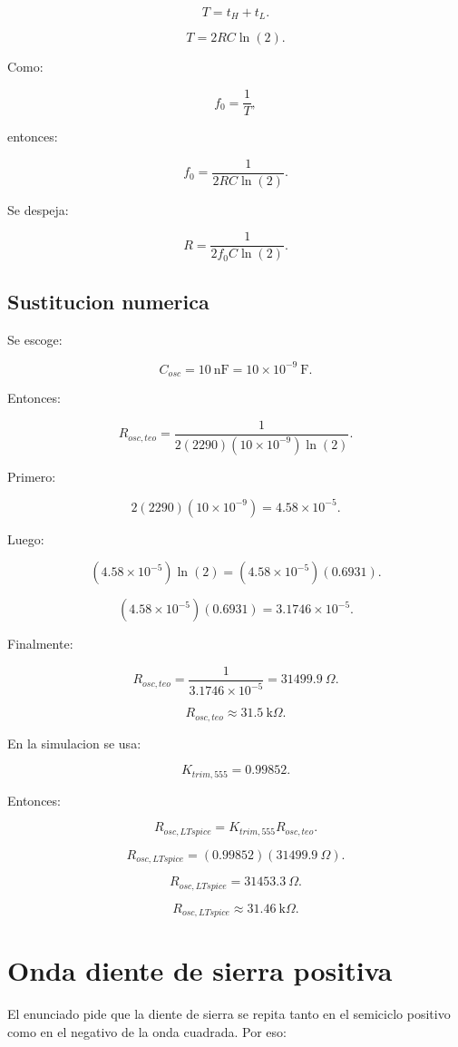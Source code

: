 \documentclass[11pt,letterpaper]{article}
\begin{document}
\[
T=t_H+t_L.
\]

\[
T=2RC\ln(2).
\]

Como:

\[
f_0=\frac{1}{T},
\]

entonces:

\[
f_0=\frac{1}{2RC\ln(2)}.
\]

Se despeja:

\[
R=\frac{1}{2f_0C\ln(2)}.
\]

\subsection{Sustitucion numerica}

Se escoge:

\[
C_{osc}=10~\text{nF}=10\times 10^{-9}~\text{F}.
\]

Entonces:

\[
R_{osc,teo}=
\frac{1}
{2(2290)(10\times 10^{-9})\ln(2)}.
\]

Primero:

\[
2(2290)(10\times 10^{-9})
=4.58\times 10^{-5}.
\]

Luego:

\[
(4.58\times 10^{-5})\ln(2)
=
(4.58\times 10^{-5})(0.6931).
\]

\[
(4.58\times 10^{-5})(0.6931)
=3.1746\times 10^{-5}.
\]

Finalmente:

\[
R_{osc,teo}
=
\frac{1}{3.1746\times 10^{-5}}
=31499.9~\Omega.
\]

\[
R_{osc,teo}\approx 31.5~\text{k}\Omega.
\]

En la simulacion se usa:

\[
K_{trim,555}=0.99852.
\]

Entonces:

\[
R_{osc,LTspice}=K_{trim,555}R_{osc,teo}.
\]

\[
R_{osc,LTspice}=(0.99852)(31499.9~\Omega).
\]

\[
R_{osc,LTspice}=31453.3~\Omega.
\]

\[
\boxed{R_{osc,LTspice}\approx 31.46~\text{k}\Omega}.
\]

\section{Onda diente de sierra positiva}

El enunciado pide que la diente de sierra se repita tanto en el semiciclo
positivo como en el negativo de la onda cuadrada. Por eso:
\end{document}
